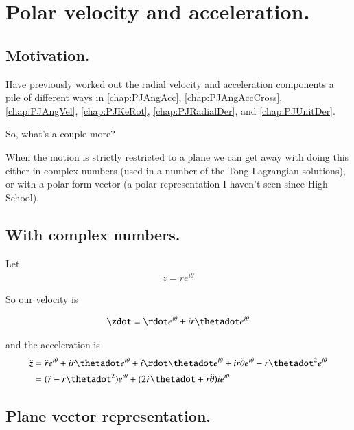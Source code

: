 \chapter{Polar velocity and acceleration.}
\date{ Jan 13, 2009.  $RCSfile: radial.tex,v $ Last $Revision: 1.6 $ $Date: 2009/06/11 16:45:58 $ }

\section{Motivation. }

Have previously worked out the radial velocity and acceleration components a pile of different ways in
\ref{chap:PJAngAcc}, 
\ref{chap:PJAngAccCross}, 
\ref{chap:PJAngVel}, 
\ref{chap:PJKeRot}, 
\ref{chap:PJRadialDer}, and
\ref{chap:PJUnitDer}.

So, what's a couple more?

When the motion is strictly restricted to a plane we can get away with doing this either in complex numbers
(used in a number of the Tong Lagrangian solutions), or with a polar form  vector (a polar representation
I haven't seen since High School).

\section{With complex numbers. }

Let
\begin{align*}
z = r e^{i\theta}
\end{align*}

So our velocity is

\begin{align*}
\zdot = \rdot e^{i\theta} + i r \thetadot e^{i\theta}
\end{align*}

and the acceleration is
\begin{align*}
\ddot{z}
&= \ddot{r} e^{i\theta} + i \dot{r} \thetadot e^{i\theta}
 + i \rdot \thetadot e^{i\theta}
 + i r \ddot{\theta} e^{i\theta}
 - r \thetadot^2 e^{i\theta} \\
&= (\ddot{r} - r \thetadot^2 ) e^{i\theta} + (2 \dot{r} \thetadot + r \ddot{\theta} ) i e^{i\theta}
\end{align*}

\section{Plane vector representation. }

